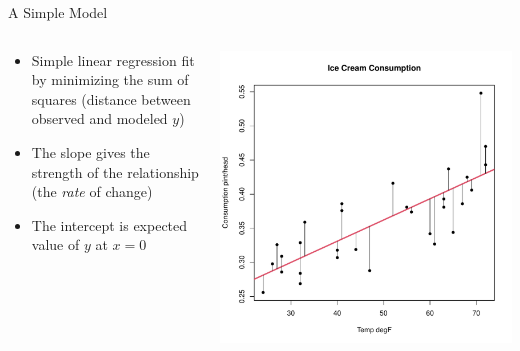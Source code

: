 \documentclass[aspectratio=169]{beamer}\usepackage[]{graphicx}\usepackage[]{color}
\makeatletter
\def\maxwidth{ %
  \ifdim\Gin@nat@width>\linewidth
    \linewidth
  \else
    \Gin@nat@width
  \fi
}
\newenvironment{knitrout}{}{} %
\makeatother
\begin{document}
\begin{frame}[fragile]{A Simple Model}
\begin{columns}
	\begin{column}{0.5\textwidth}
		\begin{itemize}
			\item Simple linear regression fit by minimizing the sum of squares (distance between observed and modeled $y$)
			\item The slope gives the strength of the relationship (the \emph{rate} of change)
			\item The intercept is expected value of $y$ at $x=0$
		\end{itemize}
	\end{column}
	\begin{column}{0.5\textwidth}
\begin{knitrout}\scriptsize
{}\color{fgcolor}
\includegraphics[width=\maxwidth]{figure/unnamed-chunk-3-1} 

\end{knitrout}
	\end{column}
\end{columns}
\end{frame}
\end{document}
